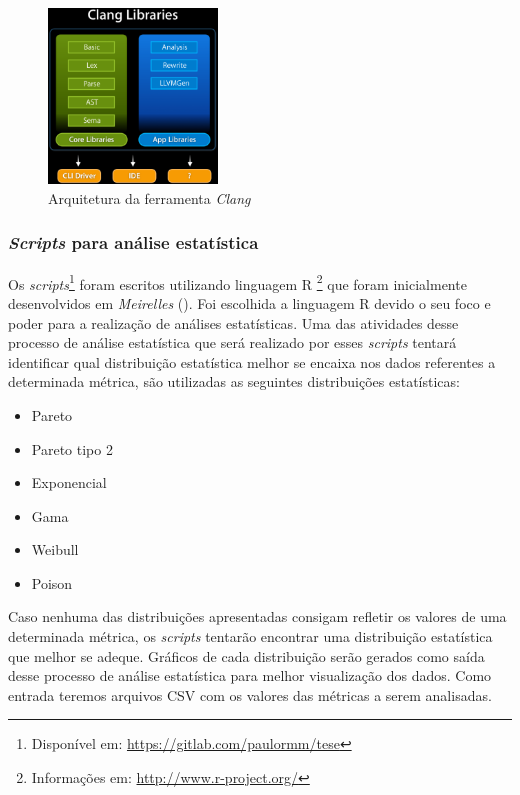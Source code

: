\begin{figure}[h]
  \centering
  \includegraphics[width=0.4\textwidth]
      {figuras/clang_arch.eps}
      \caption{Arquitetura da ferramenta \emph{Clang}}
  \label{clang_arch}
\end{figure}

\subsubsection{\textit{Scripts} para análise estatística} \label{scripts}

Os \textit{scripts}\footnote{Disponível em:
\url{https://gitlab.com/paulormm/tese}} foram escritos utilizando linguagem R
\footnote{Informações em: \url{http://www.r-project.org/}} que foram
inicialmente desenvolvidos em \emph{Meirelles} (\citeyear{meirelles2013}). Foi escolhida a linguagem R
devido o seu foco e poder para a realização de análises estatísticas. Uma das
atividades desse processo de análise estatística que será realizado
por esses \textit{scripts} tentará identificar qual distribuição estatística melhor se encaixa nos dados referentes a 
determinada métrica, são utilizadas as seguintes distribuições estatísticas:

\begin{itemize}
  \item Pareto
  \item Pareto tipo 2
  \item Exponencial
  \item Gama
  \item Weibull
  \item Poison
\end{itemize}

Caso nenhuma das distribuições apresentadas consigam refletir os valores de uma determinada métrica, os
\textit{scripts} tentarão encontrar uma distribuição estatística que melhor se adeque. Gráficos de cada distribuição serão
gerados como saída desse processo de análise estatística para melhor visualização dos dados. Como entrada teremos arquivos
CSV com os valores das métricas a serem analisadas.

